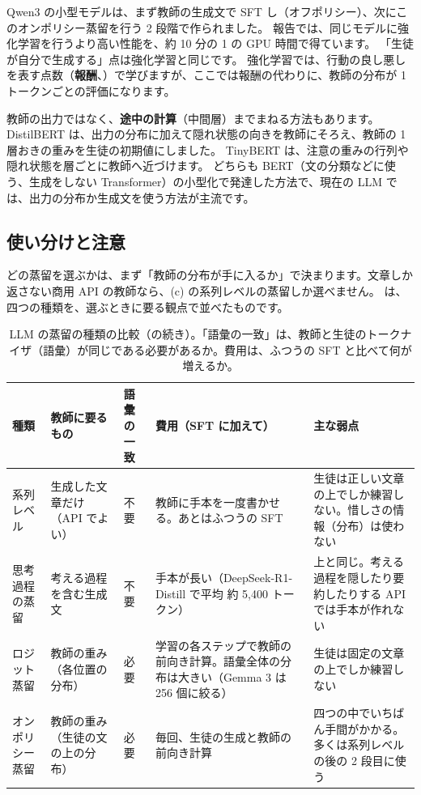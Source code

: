 Qwen3 の小型モデルは、まず教師の生成文で SFT し（オフポリシー）、次にこのオンポリシー蒸留を行う 2 段階で作られました\cite{yang2025qwen3}。
報告では、同じモデルに強化学習を行うより高い性能を、約 10 分の 1 の GPU 時間で得ています。
「生徒が自分で生成する」点は強化学習と同じです。
強化学習では、行動の良し悪しを表す点数（\textbf{報酬}、）で学びますが、ここでは報酬の代わりに、教師の分布が 1 トークンごとの評価になります。

教師の出力ではなく、\textbf{途中の計算}（中間層）までまねる方法もあります。
DistilBERT は、出力の分布に加えて隠れ状態の向きを教師にそろえ、教師の 1 層おきの重みを生徒の初期値にしました\cite{sanh2019distilbert}。
TinyBERT は、注意の重みの行列や隠れ状態を層ごとに教師へ近づけます\cite{jiao2020tinybert}。
どちらも BERT（文の分類などに使う、生成をしない Transformer）の小型化で発達した方法で、現在の LLM では、出力の分布か生成文を使う方法が主流です。

\subsection{使い分けと注意}\label{sec:distill-llm-caution}

どの蒸留を選ぶかは、まず「教師の分布が手に入るか」で決まります。文章しか返さない商用 API の教師なら、(c) の系列レベルの蒸留しか選べません。
は、四つの種類を、選ぶときに要る観点で並べたものです。

\begin{table}[tbp]
\centering
\caption{LLM の蒸留の種類の比較（の続き）。「語彙の一致」は、教師と生徒のトークナイザ（語彙）が同じである必要があるか。費用は、ふつうの SFT と比べて何が増えるか。}
\label{tab:distill-variants-cmp}
\small
\begin{tabular}{@{}>{\raggedright\arraybackslash}p{16mm}>{\raggedright\arraybackslash}p{22mm}>{\raggedright\arraybackslash}p{9mm}>{\raggedright\arraybackslash}p{28mm}>{\raggedright\arraybackslash}p{33mm}@{}}
\toprule
種類 & 教師に要るもの & 語彙の一致 & 費用（SFT に加えて） & 主な弱点 \\
\midrule
系列レベル & 生成した文章だけ（API でよい） & 不要 & 教師に手本を一度書かせる。あとはふつうの SFT & 生徒は正しい文章の上でしか練習しない。惜しさの情報（分布）は使わない \\
思考過程の蒸留 & 考える過程を含む生成文 & 不要 & 手本が長い（DeepSeek-R1-Distill で平均 約 5,400 トークン） & 上と同じ。考える過程を隠したり要約したりする API では手本が作れない \\
ロジット蒸留 & 教師の重み（各位置の分布） & 必要 & 学習の各ステップで教師の前向き計算。語彙全体の分布は大きい（Gemma 3 は 256 個に絞る） & 生徒は固定の文章の上でしか練習しない \\
オンポリシー蒸留 & 教師の重み（生徒の文の上の分布） & 必要 & 毎回、生徒の生成と教師の前向き計算 & 四つの中でいちばん手間がかかる。多くは系列レベルの後の 2 段目に使う \\
\bottomrule
\end{tabular}
\end{table}

